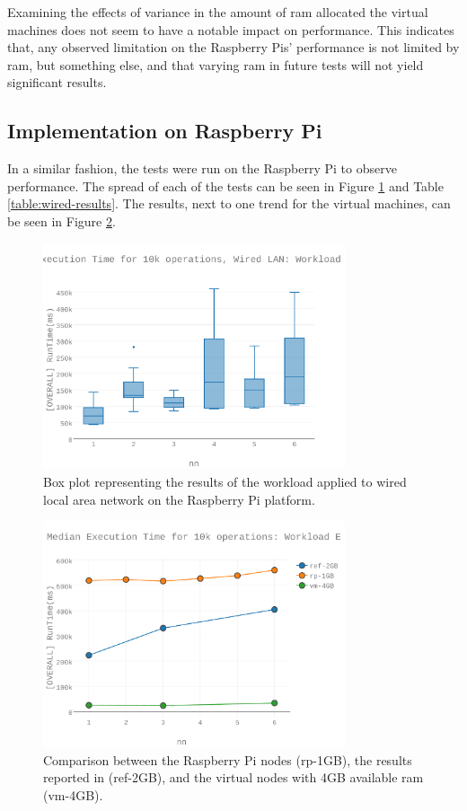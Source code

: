 Examining the effects of variance in the amount of \gls{ram} allocated the virtual machines does not seem to have a notable impact on performance.  This indicates that, any observed limitation on the Raspberry Pis’ performance is not limited by \gls{ram}, but something else, and that varying \gls{ram} in future tests will not yield significant results.


\subsection{Implementation on Raspberry Pi}

In a similar fashion, the tests were run on the Raspberry Pi to observe performance.  The spread of each of the tests can be seen in Figure \ref{fig:wle_fig10} and Table \ref{table:wired-results}.  The results, next to one trend for the virtual machines, can be seen in Figure \ref{fig:fig06}. 

\begin{figure}[h]
\includegraphics[width=3.5in]{Figures/figures-wle_fig10.pdf}

\caption{Box plot representing the results of the workload applied to wired local area network on the Raspberry Pi platform.}

\label{fig:wle_fig10}
\end{figure}

\begin{figure}[h]
\includegraphics[width=3.5in]{Figures/figures-wle_fig6.pdf}

\caption{Comparison between the Raspberry Pi nodes (rp-1GB), the results reported in \cite{Abramova2014} (ref-2GB), and the virtual nodes with 4GB available \gls{ram} (vm-4GB).}

\label{fig:fig06}
\end{figure}

